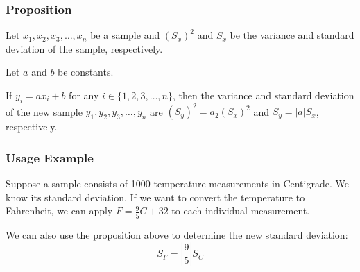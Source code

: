 \documentclass[letterpaper, 12pt]{math}
\begin{document}
\subsubsection*{Proposition}
Let \( x_{1}, x_{2}, x_{3}, \dots, x_{n} \) be a sample and
\( (S_{x})^{2} \) and \( S_{x} \) be the variance and standard deviation
of the sample, respectively. \par
Let \( a \) and \( b \) be constants. \par
If \( y_{i} = ax_{i}+b \) for any \( i \in \{1, 2, 3, \dots, n\} \),
then the variance and standard deviation of the new sample
\( y_{1}, y_{2}, y_{3}, \dots, y_{n} \) are
\( (S_{y})^{2} = a_{2}(S_{x})^{2} \) and \( S_{y} = |a|S_{x} \), respectively.

\subsubsection*{Usage Example}
Suppose a sample consists of 1000 temperature measurements in Centigrade.
We know its standard deviation. If we want to convert the temperature to
Fahrenheit, we can apply \( F = \frac{9}{5}C + 32 \) to each individual
measurement. \par
We can also use the proposition above to determine the new standard deviation:
\[ S_{F} = |\frac{9}{5}|S_{C} \]
\end{document}

